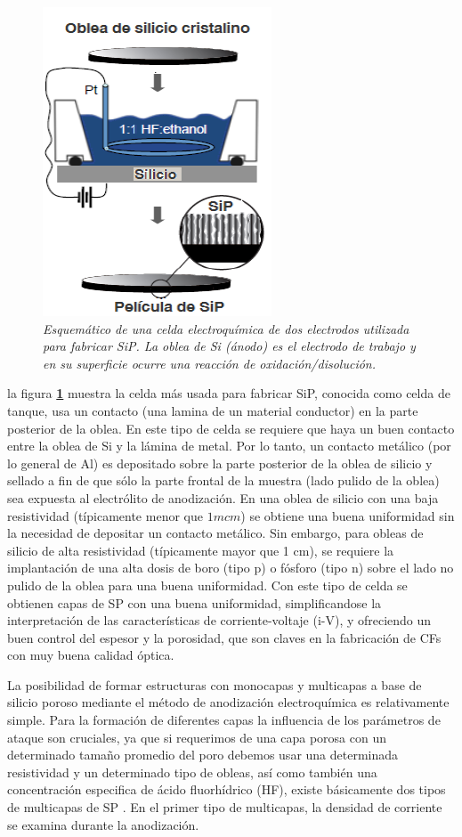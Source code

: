\documentclass[a4paper,11pt,]{book}
\begin{document}
\begin{figure}[H]
	\centering
	\includegraphics[scale=.7]{../Images/esp}
	\caption{\emph{Esquemático de una celda electroquímica de dos electrodos utilizada para fabricar SiP. La oblea de Si (ánodo) es el electrodo de trabajo y en su superficie ocurre una reacción de oxidación/disolución.}}
	\label{fig:CP13}
\end{figure}
la figura \textbf{\ref{fig:CP13}} muestra la celda más usada para fabricar  SiP, conocida como celda de tanque, usa un contacto (una lamina  de un material  conductor)  en la parte posterior  de la oblea. En este tipo de celda se requiere que haya un buen contacto entre la oblea de Si y la lámina de metal. Por lo tanto, un contacto metálico (por lo general de Al) es depositado  sobre la parte posterior  de la oblea de silicio y sellado a fin de que sólo la parte frontal de la muestra (lado pulido  de la oblea) sea expuesta  al electrólito  de anodización.  En una oblea de silicio  con una baja resistividad (típicamente menor que $1 mcm$) se obtiene una buena uniformidad sin la necesidad de depositar un contacto metálico. 
Sin embargo, para obleas de silicio de alta resistividad  (típicamente mayor que 1 cm), se requiere la implantación de una alta dosis de boro (tipo p) o fósforo (tipo n) sobre el lado no pulido de la oblea para una buena uniformidad.  Con este tipo de celda se obtienen capas de SP con una buena uniformidad, simplificandose la interpretación  de las características de corriente-voltaje (i-V), y ofreciendo un buen control del espesor y la porosidad, que son claves en la fabricación de CFs con muy buena calidad óptica.


La posibilidad de formar estructuras con monocapas y multicapas a base de silicio poroso mediante el método de anodización electroquímica es relativamente simple. Para la formación de diferentes capas la influencia de los parámetros de ataque son cruciales, ya que si requerimos de una capa porosa con un determinado tamaño promedio del poro debemos usar una determinada resistividad y un determinado tipo de obleas, así como también una concentración especifica de ácido fluorhídrico (HF), existe básicamente dos tipos de multicapas de SP . En el primer tipo de multicapas, la densidad de corriente se examina durante la anodización.
\end{document}

